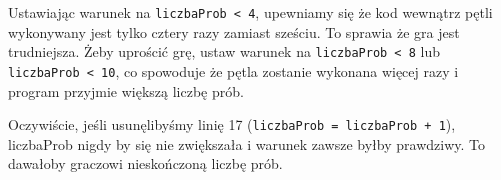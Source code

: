 \documentclass{book}
\begin{document}
Ustawiając warunek na \lstinline{liczbaProb < 4}, upewniamy się że kod wewnątrz pętli wykonywany jest tylko cztery razy zamiast sześciu. To sprawia że gra jest trudniejsza. Żeby uprościć grę, ustaw warunek na \lstinline{liczbaProb < 8} lub \lstinline{liczbaProb < 10}, co spowoduje że pętla zostanie wykonana więcej razy i program przyjmie większą liczbę prób.

Oczywiście, jeśli usunęlibyśmy linię 17 (\lstinline{liczbaProb = liczbaProb + 1}), liczbaProb nigdy by się nie zwiększała i warunek zawsze byłby prawdziwy. To dawałoby graczowi nieskończoną liczbę prób.
\end{document}
